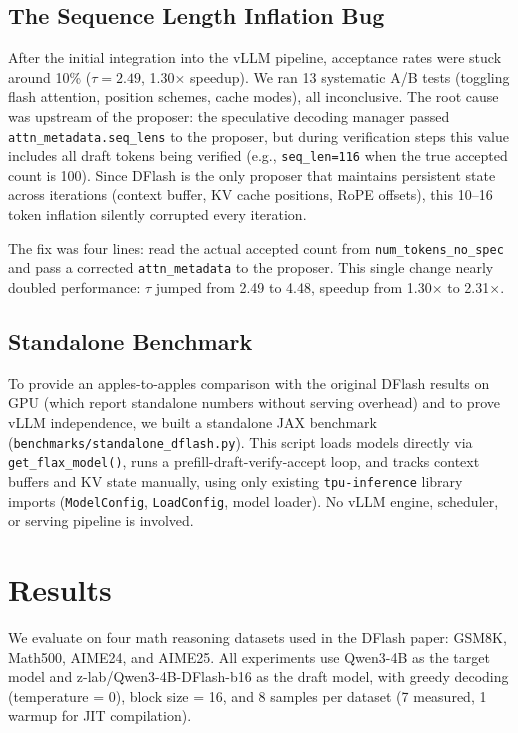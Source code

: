 \documentclass[12pt,letterpaper]{article}
\begin{document}
\subsection{The Sequence Length Inflation Bug}

After the initial integration into the vLLM pipeline, acceptance rates were stuck around 10\% ($\tau=2.49$, 1.30$\times$ speedup). We ran 13 systematic A/B tests (toggling flash attention, position schemes, cache modes), all inconclusive. The root cause was upstream of the proposer: the speculative decoding manager passed \texttt{attn\_metadata.seq\_lens} to the proposer, but during verification steps this value includes all draft tokens being verified (e.g., \texttt{seq\_len=116} when the true accepted count is 100). Since DFlash is the only proposer that maintains persistent state across iterations (context buffer, KV cache positions, RoPE offsets), this 10--16 token inflation silently corrupted every iteration.

The fix was four lines: read the actual accepted count from \texttt{num\_tokens\_no\_spec} and pass a corrected \texttt{attn\_metadata} to the proposer. This single change nearly doubled performance: $\tau$ jumped from 2.49 to 4.48, speedup from 1.30$\times$ to 2.31$\times$.

\subsection{Standalone Benchmark}

To provide an apples-to-apples comparison with the original DFlash results on GPU (which report standalone numbers without serving overhead) and to prove vLLM independence, we built a standalone JAX benchmark (\texttt{benchmarks/standalone\_dflash.py}). This script loads models directly via \texttt{get\_flax\_model()}, runs a prefill-draft-verify-accept loop, and tracks context buffers and KV state manually, using only existing \texttt{tpu-inference} library imports (\texttt{ModelConfig}, \texttt{LoadConfig}, model loader). No vLLM engine, scheduler, or serving pipeline is involved.


\section{Results}

We evaluate on four math reasoning datasets used in the DFlash paper: GSM8K, Math500, AIME24, and AIME25. All experiments use Qwen3-4B as the target model and z-lab/Qwen3-4B-DFlash-b16 as the draft model, with greedy decoding (temperature = 0), block size = 16, and 8 samples per dataset (7 measured, 1 warmup for JIT compilation).
\end{document}
